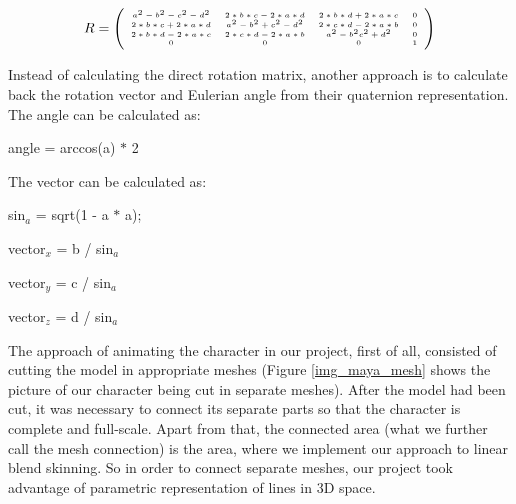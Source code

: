 \documentclass[times, 10pt,twocolumn]{article}
\begin{document}
\[ R = \left( \begin{tiny}\begin{array}{cccc}
a^{2}-b^{2}-c^{2}-d^{2} & 2 \ast b \ast c-2 \ast a \ast d & 2 \ast b \ast d+2 \ast a \ast c & 0 \\
2 \ast b \ast c+2 \ast a \ast d & a^{2}-b^{2}+c^{2}-d^{2} & 2 \ast c \ast d-2 \ast a \ast b & 0 \\
2 \ast b \ast d-2 \ast a \ast c & 2 \ast c \ast d-2 \ast a \ast b & a^{2}-b^{2}c^{2}+d^{2} & 0 \\
0 & 0 & 0 & 1
\end{array}\end{tiny} \right)\]

Instead of calculating the direct rotation matrix, another approach is to calculate back the rotation vector and Eulerian angle from their quaternion representation. The angle can be calculated as:
\begin{description}
	\item angle = arccos(a) $\ast$ 2
\end{description}

The vector can be calculated as:

\begin{description}
    \setlength{\itemsep}{0pt}

    \item sin$_a$ = sqrt(1 - a $\ast$ a);

	\item vector$_x$ = b / sin$_a$
	\item vector$_y$ = c / sin$_a$
	\item vector$_z$ = d / sin$_a$
\end{description}


\label{line_in_space_section}

The approach of animating the character in our project, first of all, consisted of cutting the model in appropriate meshes (Figure \ref{img_maya_mesh} shows the picture of our character being cut in separate meshes).  After the model had been cut, it was necessary to connect its separate parts so that the character is complete and full-scale. Apart from that, the connected area (what we further call the mesh connection) is the area, where we implement our approach to linear blend skinning. So in order to connect separate meshes, our project took advantage of parametric representation of lines in 3D space.
\end{document}
